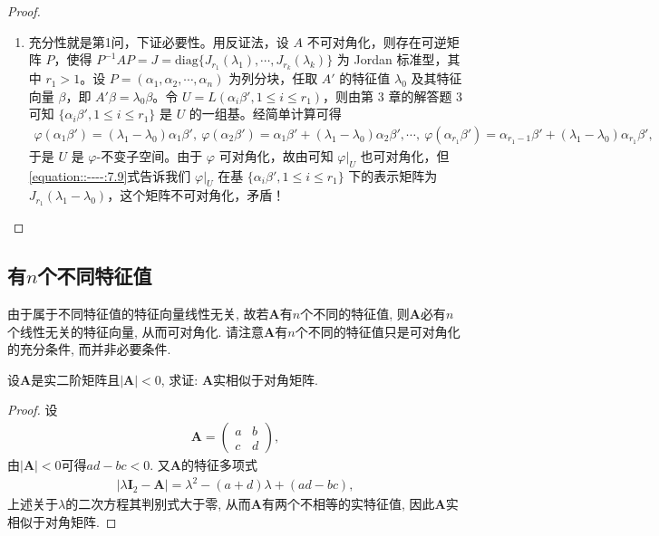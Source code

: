 \documentclass[../../main.tex]{subfiles}
\begin{document}
\begin{proof}
\begin{enumerate}
\item 充分性就是第1问，下证必要性。用反证法，设 $A$ 不可对角化，则存在可逆矩阵 $P$，使得 $P^{-1}AP = J = \mathrm{diag}\{J_{r_1}(\lambda_1),\cdots,J_{r_k}(\lambda_k)\}$ 为 Jordan 标准型，其中 $r_1 > 1$。设 $P = (\alpha_1,\alpha_2,\cdots,\alpha_n)$ 为列分块，任取 $A'$ 的特征值 $\lambda_0$ 及其特征向量 $\beta$，即 $A'\beta = \lambda_0\beta$。令 $U = L(\alpha_i\beta',1\leq i\leq r_1)$，则由第 3 章的解答题 3 可知 $\{\alpha_i\beta',1\leq i\leq r_1\}$ 是 $U$ 的一组基。经简单计算可得
\begin{align}\label{equation::----:7.9}
\varphi(\alpha_1\beta')=(\lambda_1 - \lambda_0)\alpha_1\beta',\ \varphi(\alpha_2\beta')=\alpha_1\beta' + (\lambda_1 - \lambda_0)\alpha_2\beta',\cdots,\ \varphi(\alpha_{r_1}\beta')=\alpha_{r_1 - 1}\beta' + (\lambda_1 - \lambda_0)\alpha_{r_1}\beta',
\end{align}
于是 $U$ 是 $\varphi$-不变子空间。由于 $\varphi$ 可对角化，故由可知 $\varphi|_U$ 也可对角化，但\eqref{equation::----:7.9}式告诉我们 $\varphi|_U$ 在基 $\{\alpha_i\beta',1\leq i\leq r_1\}$ 下的表示矩阵为 $J_{r_1}(\lambda_1 - \lambda_0)$，这个矩阵不可对角化，矛盾！
\end{enumerate}
\end{proof}

\subsection{有$n$个不同特征值}

由于属于不同特征值的特征向量线性无关, 故若$\boldsymbol{A}$有$n$个不同的特征值, 则$\boldsymbol{A}$必有$n$个线性无关的特征向量, 从而可对角化. 请注意$\boldsymbol{A}$有$n$个不同的特征值只是可对角化的充分条件, 而并非必要条件. 

\begin{example}
设$\boldsymbol{A}$是实二阶矩阵且$|\boldsymbol{A}|< 0$, 求证: $\boldsymbol{A}$实相似于对角矩阵.
\end{example}
\begin{proof}
设
\begin{align*}
\boldsymbol{A}=\begin{pmatrix}
a&b\\
c&d
\end{pmatrix},
\end{align*}
由$|\boldsymbol{A}|< 0$可得$ad - bc< 0$. 又$\boldsymbol{A}$的特征多项式
\begin{align*}
|\lambda\boldsymbol{I}_2-\boldsymbol{A}|=\lambda^2-(a + d)\lambda+(ad - bc),
\end{align*}
上述关于$\lambda$的二次方程其判别式大于零, 从而$\boldsymbol{A}$有两个不相等的实特征值, 因此$\boldsymbol{A}$实相似于对角矩阵.
\end{proof}
\end{document}

